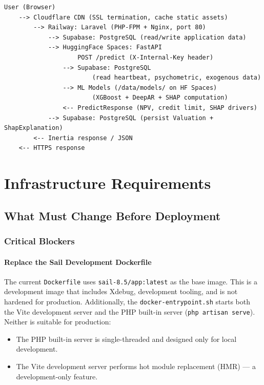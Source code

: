 \documentclass[12pt,a4paper]{report}
\begin{document}
\begin{lstlisting}[caption={Request Flow: User to AI Valuation}]
User (Browser)
    --> Cloudflare CDN (SSL termination, cache static assets)
        --> Railway: Laravel (PHP-FPM + Nginx, port 80)
            --> Supabase: PostgreSQL (read/write application data)
            --> HuggingFace Spaces: FastAPI
                    POST /predict (X-Internal-Key header)
                --> Supabase: PostgreSQL
                        (read heartbeat, psychometric, exogenous data)
                --> ML Models (/data/models/ on HF Spaces)
                        (XGBoost + DeepAR + SHAP computation)
                <-- PredictResponse (NPV, credit limit, SHAP drivers)
            --> Supabase: PostgreSQL (persist Valuation + ShapExplanation)
        <-- Inertia response / JSON
    <-- HTTPS response
\end{lstlisting}

\chapter{Infrastructure Requirements}
\label{ch:infrastructure}

\section{What Must Change Before Deployment}

\subsection{Critical Blockers}

\subsubsection{Replace the Sail Development Dockerfile}

The current \texttt{Dockerfile} uses \texttt{sail-8.5/app:latest} as
the base image. This is a development image that includes Xdebug,
development tooling, and is not hardened for production. Additionally,
the \texttt{docker-entrypoint.sh} starts both the Vite development
server and the PHP built-in server (\texttt{php artisan serve}).
Neither is suitable for production:

\begin{itemize}[leftmargin=1.5em]
    \item The PHP built-in server is single-threaded and designed only
          for local development.
    \item The Vite development server performs hot module replacement
          (HMR) — a development-only feature.
\end{itemize}
\end{document}
